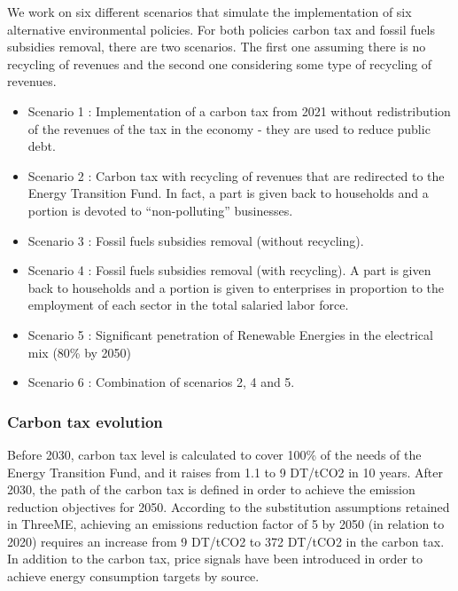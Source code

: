 \documentclass[
]{article}
\begin{document}
We work on six different scenarios that simulate the implementation of
six alternative environmental policies. For both policies carbon tax and
fossil fuels subsidies removal, there are two scenarios. The first one
assuming there is no recycling of revenues and the second one
considering some type of recycling of revenues.

\begin{itemize}
\item
  Scenario 1 : Implementation of a carbon tax from 2021 without
  redistribution of the revenues of the tax in the economy - they are
  used to reduce public debt.
\item
  Scenario 2 : Carbon tax with recycling of revenues that are redirected
  to the Energy Transition Fund. In fact, a part is given back to
  households and a portion is devoted to ``non-polluting'' businesses.
\item
  Scenario 3 : Fossil fuels subsidies removal (without recycling).
\item
  Scenario 4 : Fossil fuels subsidies removal (with recycling). A part
  is given back to households and a portion is given to enterprises in
  proportion to the employment of each sector in the total salaried
  labor force.
\item
  Scenario 5 : Significant penetration of Renewable Energies in the
  electrical mix (80\% by 2050)
\item
  Scenario 6 : Combination of scenarios 2, 4 and 5.
\end{itemize}

\hypertarget{carbon-tax-evolution}{%
\subsubsection{Carbon tax evolution}\label{carbon-tax-evolution}}

Before 2030, carbon tax level is calculated to cover 100\% of the needs
of the Energy Transition Fund, and it raises from 1.1 to 9 DT/tCO2 in 10
years. After 2030, the path of the carbon tax is defined in order to
achieve the emission reduction objectives for 2050. According to the
substitution assumptions retained in ThreeME, achieving an emissions
reduction factor of 5 by 2050 (in relation to 2020) requires an increase
from 9 DT/tCO2 to 372 DT/tCO2 in the carbon tax. In addition to the
carbon tax, price signals have been introduced in order to achieve
energy consumption targets by source.
\end{document}
